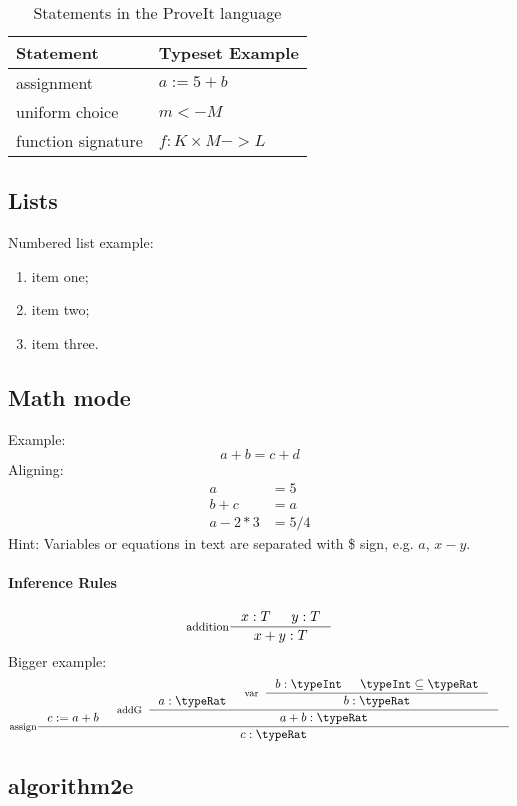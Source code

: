 \documentclass[12pt]{article}
\newcommand{\proveit} {ProveIt\xspace}
\begin{document}
\begin{table}[h]
\centering
\begin{tabular}{| l | l |}
	\hline
	\bf{Statement} & \bf{Typeset Example} \\
	\hline
	assignment & $a := 5 + b$ \\
	\hline
	uniform choice & $m <- M$ \\
	\hline
	function signature & $f : K \times M -> L$\\
	\hline
\end{tabular}
\caption{Statements in the \proveit language}
\label{tab:statements}
\end{table}


\subsection{Lists}

Numbered list example:
\begin{enumerate}
	\item item one; 
	\item item two;
	\item item three.
\end{enumerate} 

\subsection{Math mode}
Example:
\[
a + b = c + d
\]
Aligning:
\begin{align*}
	a &= 5 \\
	b + c &= a \\
	a -2*3 &= 5/4
\end{align*}
Hint: Variables or equations in text are separated with \$ sign, e.g. $a$, $x - y$.

\paragraph{Inference Rules}
\[ 
	\inference[addition]{x : T & y : T}{x + y : T} 
\]
Bigger example:
\[
\inference[assign]{c := a + b & 
	\inference[addG]{a : \typeRat & 
		\inference[var]{b : \typeInt & \typeInt \subseteq \typeRat}{b : \typeRat}
		}{a + b : \typeRat}
	}{c : \typeRat}
\]


\subsection{algorithm2e}
\end{document}
